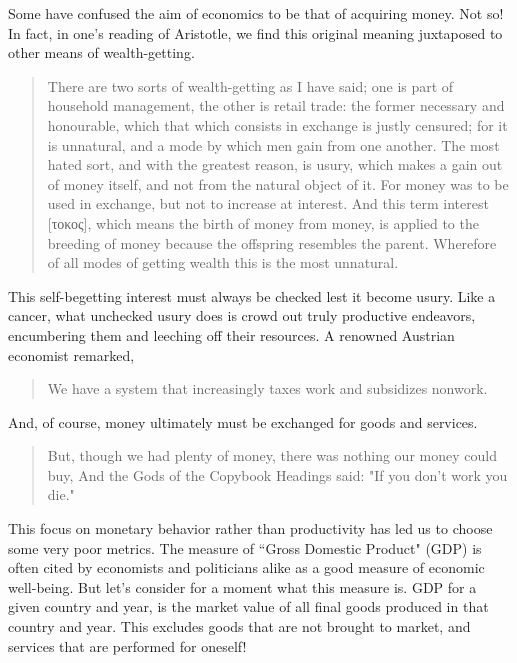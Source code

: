 \documentclass[letterpaper]{article}
\begin{document}
Some have confused the aim of economics to be that of acquiring money. Not so! In fact, in one's reading of Aristotle, we find this original meaning juxtaposed to other means of wealth-getting.

\begin{quote}
  There are two sorts of wealth-getting as I have said; one is part of household management, the other is retail trade: the former necessary and honourable, which that which consists in exchange is justly censured; for it is unnatural, and a mode by which men gain from one another. The most hated sort, and with the greatest reason, is usury, which makes a gain out of money itself, and not from the natural object of it. For money was to be used in exchange, but not to increase at interest. And this term interest [τοκος], which means the birth of money from money, is applied to the breeding of money because the offspring resembles the parent. Wherefore of all modes of getting wealth this is the most unnatural.
\end{quote}

This self-begetting interest must always be checked lest it become usury. Like a cancer, what unchecked usury does is crowd out truly productive endeavors, encumbering them and leeching off their resources. A renowned Austrian economist remarked,

\begin{quote}
  We have a system that increasingly taxes work and subsidizes nonwork.
\end{quote}

And, of course, money ultimately must be exchanged for goods and services.


\begin{quote}
  But, though we had plenty of money, there was nothing our money could buy,
  And the Gods of the Copybook Headings said: "If you don't work you die."
\end{quote}

This focus on monetary behavior rather than productivity has led us to choose some very poor metrics. The measure of ``Gross Domestic Product" (GDP) is often cited by economists and politicians alike as a good measure of economic well-being. But let's consider for a moment what this measure is. GDP for a given country and year, is the market value of all final goods produced in that country and year. This excludes goods that are not brought to market, and services that are performed for oneself!
\end{document}

